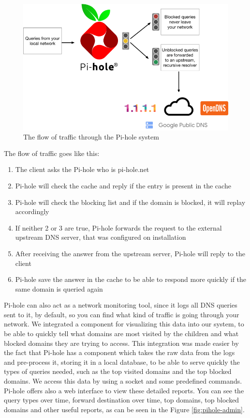 \begin{figure}[th]
\centering
\includegraphics[width=1\textwidth]{Figures/pihole-dns}
\decoRule
\caption{The flow of traffic through the Pi-hole system}
\label{fig:pihole-dns}
\end{figure}

The flow of traffic goes like this:
\begin{enumerate}
\item The client asks the Pi-hole who is pi-hole.net
\item Pi-hole will check the cache and reply if the entry is present in the cache
\item Pi-hole will check the blocking list and if the domain is blocked, it will replay accordingly
\item If neither 2 or 3 are true, Pi-hole forwards the request to the external upstream DNS server, that was configured on installation
\item After receiving the answer from the upstream server, Pi-hole will reply to the client
\item Pi-hole save the answer in the cache to be able to respond more quickly if the same domain is queried again
\end{enumerate}

Pi-hole can also act as a network monitoring tool, since it logs all DNS queries sent to it, by default, so you can find what kind of traffic is going through your network. We integrated a component for visualizing this data into our system, to be able to quickly tell what domains are most visited by the children and what blocked domains they are trying to access. This integration was made easier by the fact that Pi-hole has a component which takes the raw data from the logs and pre-process it, storing it in a local database, to be able to serve quickly the types of queries needed, such as the top visited domains and the top blocked domains. We access this data by using a socket and some predefined commands. Pi-hole offers also a web interface to view these detailed reports. You can see the query types over time, forward destination over time, top domains, top blocked domains and other useful reports, as can be seen in the Figure \ref{fig:pihole-admin}.

